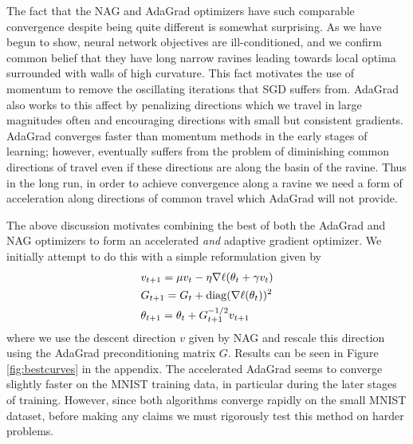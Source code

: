 The fact that the NAG and AdaGrad optimizers have such comparable convergence
despite being quite different is somewhat surprising. As we have begun to show,
neural network objectives are ill-conditioned, and we confirm common belief
that they have long narrow ravines leading towards local optima surrounded with
walls of high curvature. This fact motivates the use of momentum to remove the
oscillating iterations that SGD suffers from. AdaGrad also works to this affect
by penalizing directions which we travel in large magnitudes often and
encouraging directions with small but consistent gradients. AdaGrad converges
faster than momentum methods in the early stages of learning; however,
eventually suffers from the problem of diminishing common directions of travel
even if these directions are along the basin of the ravine. Thus in the long
run, in order to achieve convergence along a ravine we need a form of
acceleration along directions of common travel which AdaGrad will not provide. 

The above discussion motivates combining the best of both the AdaGrad and
NAG optimizers to form an accelerated {\it and} adaptive gradient optimizer. We
initially attempt to do this with a simple reformulation given by
\begin{align*}
&v_{t+1} = \mu v_t - \eta \nabla \ell (\theta_t + \gamma v_t) \\
&G_{t+1} = G_{t} + \operatorname*{diag}(\nabla \ell (\theta_t))^2 \\
&\theta_{t+1} = \theta_t + G_{t+1}^{-1/2} v_{t+1}
\end{align*}
where we use the descent direction $v$ given by NAG and rescale this direction
using the AdaGrad preconditioning matrix $G$. Results can be seen in Figure \ref{fig:bestcurves} 
in the appendix. The accelerated AdaGrad seems to converge slightly faster on
the MNIST training data, in particular during the later stages of training.
However, since both algorithms converge rapidly on the small MNIST
dataset, before making any claims we must rigorously test this method on harder
problems.

